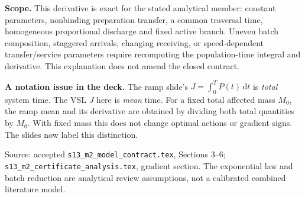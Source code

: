 \documentclass[11pt]{article}
\newcommand{\dd}{\,\mathrm{d}}
\begin{document}
\textbf{Scope.} This derivative is exact for the stated analytical member:
constant parameters, nonbinding preparation transfer, a common traversal time,
homogeneous proportional discharge and fixed active branch. Uneven batch
composition, staggered arrivals, changing receiving, or speed-dependent
transfer/service parameters require recomputing the population-time integral
and derivative. This explanation does not amend the closed contract.

\textbf{A notation issue in the deck.} The ramp slide's \(J=\int_0^T P(t)\dd t\)
is \emph{total} system time. The VSL \(J\) here is \emph{mean} time. For a fixed
total affected mass \(M_0\), the ramp mean and its derivative are obtained by
dividing both total quantities by \(M_0\). With fixed mass this does not change
optimal actions or gradient signs. The slides now label this distinction.

\small Source: accepted \texttt{s13\_m2\_model\_contract.tex}, Sections 3--6;
\texttt{s13\_m2\_certificate\_analysis.tex}, gradient section. The exponential
law and batch reduction are analytical review assumptions, not a calibrated
combined literature model.
\end{document}
